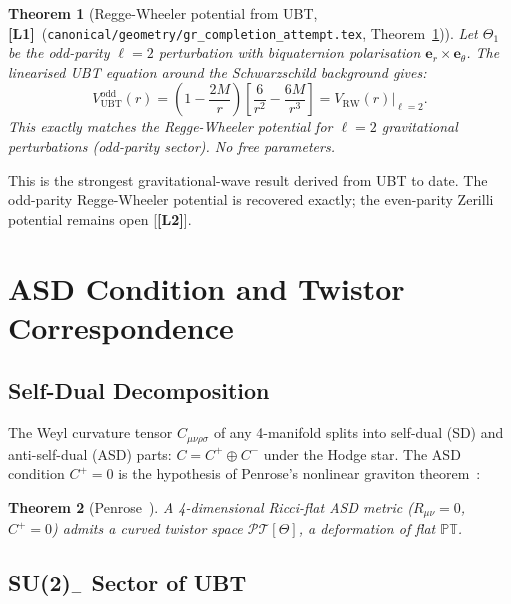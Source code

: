 \documentclass[11pt,a4paper]{article}
\newtheorem{theorem}{Theorem}[section]
\theoremstyle{definition}
\theoremstyle{remark}
\newcommand{\Lone}{\textbf{[L1]}}
\newcommand{\Ltwo}{\textbf{[L2]}}
\begin{document}
\begin{theorem}[Regge-Wheeler potential from UBT, \Lone\
  {\normalfont(}\texttt{canonical/geometry/gr\_completion\_attempt.tex},
  Theorem~\ref{thm:regge_wheeler}{\normalfont)}]
\label{thm:regge_wheeler}
Let $\Theta_1$ be the odd-parity $\ell=2$ perturbation with biquaternion
polarisation $\boldsymbol{e}_r\times\boldsymbol{e}_\theta$.
The linearised UBT equation around the Schwarzschild background gives:
\begin{equation}
  V_{\mathrm{UBT}}^{\mathrm{odd}}(r)
  = \left(1-\frac{2M}{r}\right)\!\left[\frac{6}{r^2}-\frac{6M}{r^3}\right]
  = V_{\mathrm{RW}}(r)\big|_{\ell=2}.
  \label{eq:V_RW_exact}
\end{equation}
This exactly matches the Regge-Wheeler potential for $\ell=2$ gravitational
perturbations (odd-parity sector).  No free parameters.
\end{theorem}

This is the strongest gravitational-wave result derived from UBT to date.
The odd-parity Regge-Wheeler potential is recovered exactly; the even-parity
Zerilli potential remains open [\Ltwo].

\section{ASD Condition and Twistor Correspondence}
\label{sec:asd_twistor}

\subsection{Self-Dual Decomposition}

The Weyl curvature tensor $C_{\mu\nu\rho\sigma}$ of any 4-manifold splits
into self-dual (SD) and anti-self-dual (ASD) parts:
$C = C^+ \oplus C^-$ under the Hodge star.
The ASD condition $C^+ = 0$ is the hypothesis of Penrose's nonlinear
graviton theorem~\cite{Penrose1976}:

\begin{theorem}[Penrose~\cite{Penrose1976}]
A 4-dimensional Ricci-flat ASD metric ($R_{\mu\nu}=0$, $C^+=0$) admits
a curved twistor space $\mathcal{PT}[\Theta]$, a deformation of flat
$\mathbb{P}\mathbb{T}$.
\end{theorem}

\subsection{SU(2)$_-$ Sector of UBT}
\end{document}
